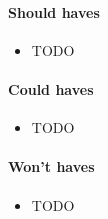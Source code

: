 \paragraph{Should haves}
\begin{itemize}
	\item TODO
\end{itemize}

\paragraph{Could haves}
\begin{itemize}
	\item TODO
\end{itemize}

\paragraph{Won't haves}
\begin{itemize}
	\item TODO
\end{itemize}
